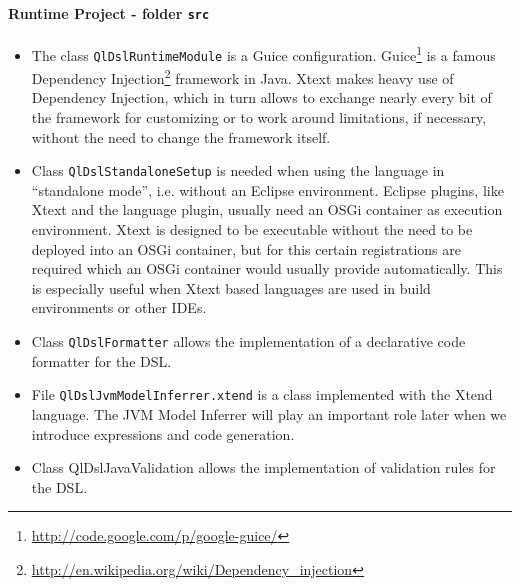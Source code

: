 \paragraph{Runtime Project - folder \texttt{src}}
\begin{itemize}
\item The class \texttt{QlDslRuntimeModule} is a Guice configuration.
Guice\footnote{\url{http://code.google.com/p/google-guice/}} is a famous
Dependency Injection\footnote{\url{http://en.wikipedia.org/wiki/Dependency_injection}} framework in Java. 
Xtext makes heavy use of Dependency Injection, which in turn allows to exchange
nearly every bit of the framework for customizing or to work around limitations,
if necessary, without the need to change the framework itself.
\item Class \texttt{QlDslStandaloneSetup} is needed when using the language in
``standalone mode'', i.e. without an Eclipse environment. Eclipse plugins, like
Xtext and the language plugin, usually need an OSGi container as execution
environment. Xtext is designed to be executable without the need to be
deployed into an OSGi container, but for this certain registrations are
required which an OSGi container would usually provide automatically. This is
especially useful when Xtext based languages are used in build environments or
other IDEs.
\item Class \texttt{QlDslFormatter} allows the implementation of a declarative
code formatter for the DSL.
\item File \texttt{QlDslJvmModelInferrer.xtend} is a class implemented with the
Xtend language. The JVM Model Inferrer will play an important role later when we
introduce expressions and code generation.
\item Class QlDslJavaValidation allows the implementation of validation rules
for the DSL.
\end{itemize}


